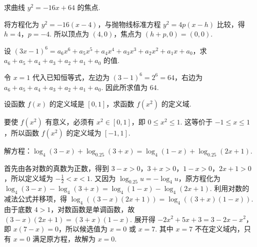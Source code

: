 \documentclass[UTF8,a4paper,oneside,11pt]{ctexbook}
\begin{document}
\begin{problem}

求曲线 \(y^{2}=-16x+64\) 的焦点.

\begin{solution}
将方程化为 \(y^2=-16(x-4)\)，与抛物线标准方程 \(y^2=4p(x-h)\) 比较，得 \(h=4\)，\(p=-4\). 所以顶点为 \((4,0)\)，焦点为 \((h+p,0)=(0,0)\).
\end{solution}
\end{problem}

\begin{problem}

设 \((3x-1)^{6}=a_{6}x^{6}+a_{5}x^{5}+a_{4}x^{4}+a_{3}x^{3}+a_{2}x^{2}+a_{1}x+a_{0}\)，求 \(a_{6}+a_{5}+a_{4}+a_{3}+a_{2}+a_{1}+a_{0}\) 的值.

\begin{solution}
令 \(x=1\) 代入已知恒等式，左边为 \((3-1)^6=2^6=64\)，右边为 \(a_6+a_5+a_4+a_3+a_2+a_1+a_0\). 因此所求值为 \(64\).
\end{solution}
\end{problem}

\begin{problem}

设函数 \(f(x)\) 的定义域是 \([0,1]\)，求函数 \(f(x^2)\) 的定义域.

\begin{solution}
要使 \(f(x^2)\) 有意义，必须有 \(x^2\in[0,1]\)，即 \(0\leqslant x^2\leqslant1\). 这等价于 \(-1\leqslant x\leqslant1\)，所以函数 \(f(x^2)\) 的定义域为 \([-1,1]\).
\end{solution}
\end{problem}

\begin{problem}

解方程：\(\log_4(3-x)+\log_{0.25}(3+x)=\log_4(1-x)+\log_{0.25}(2x+1)\).

\begin{solution}
首先由各对数的真数为正数，得到 \(3-x>0\)，\(3+x>0\)，\(1-x>0\)，\(2x+1>0\)，所以定义域为 \(-\frac{1}{2}<x<1\). 又因为 \(\log_{0.25}u=-\log_4u\)，原方程化为 \(\log_4(3-x)-\log_4(3+x)=\log_4(1-x)-\log_4(2x+1)\). 利用对数的减法公式并移项，得 \(\log_4\left((3-x)(2x+1)\right)=\log_4\left((3+x)(1-x)\right)\). 由于底数 \(4>1\)，对数函数是单调函数，故 \((3-x)(2x+1)=(3+x)(1-x)\). 展开得 \(-2x^2+5x+3=3-2x-x^2\)，即 \(x(7-x)=0\)，所以候选值为 \(x=0\) 或 \(x=7\). 其中 \(x=7\) 不在定义域内，只有 \(x=0\) 满足原方程，故解为 \(x=0\).
\end{solution}
\end{problem}
\end{document}
